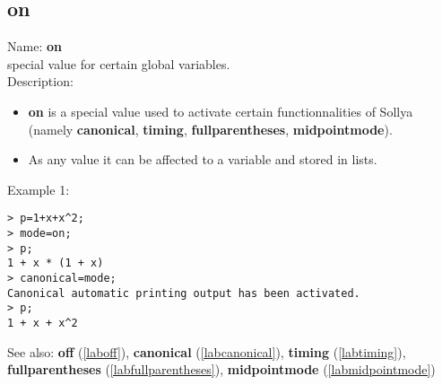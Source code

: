 \subsection{on}
\label{labon}
\noindent Name: \textbf{on}\\
special value for certain global variables.\\

\noindent Description: \begin{itemize}

\item \textbf{on} is a special value used to activate certain functionnalities of Sollya
   (namely \textbf{canonical}, \textbf{timing}, \textbf{fullparentheses}, \textbf{midpointmode}).

\item As any value it can be affected to a variable and stored in lists.
\end{itemize}
\noindent Example 1: 
\begin{center}\begin{minipage}{15cm}\begin{Verbatim}[frame=single]
> p=1+x+x^2;
> mode=on;
> p;
1 + x * (1 + x)
> canonical=mode;
Canonical automatic printing output has been activated.
> p;
1 + x + x^2
\end{Verbatim}
\end{minipage}\end{center}
See also: \textbf{off} (\ref{laboff}), \textbf{canonical} (\ref{labcanonical}), \textbf{timing} (\ref{labtiming}), \textbf{fullparentheses} (\ref{labfullparentheses}), \textbf{midpointmode} (\ref{labmidpointmode})
